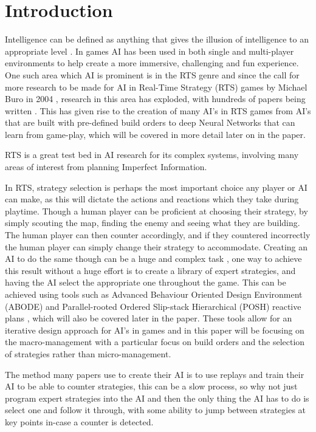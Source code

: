 \documentclass[journal]{IEEEtran}
\begin{document}
\section{Introduction}
 Intelligence can be defined as anything that gives the illusion of intelligence to an appropriate level \cite{AIBook}. In games AI has been used in both single and multi-player environments to help create a more immersive, challenging and fun experience. One such area which AI is prominent is in the RTS genre and since the call for more research to be made for AI in Real-Time Strategy (RTS) games by Michael Buro in 2004 \cite{CallFor}, research in this area has exploded, with hundreds of papers being written \cite{Survey}. This has given rise to the creation of many AI's in RTS games from AI's that are built with pre-defined build orders \cite{Swen} to deep Neural Networks \cite{Deep} that can learn from game-play, which will be covered in more detail later on in the paper.

RTS is a great test bed in AI research for its complex systems, involving many areas of interest from planning  Imperfect Information. \cite{StarCraftBot}

In RTS, strategy selection is perhaps the most important choice any player or AI can make, as this will dictate the actions and reactions which they take during playtime. Though a human player can be proficient at choosing their strategy, by simply scouting the map, finding the enemy and seeing what they are building. The human player can then counter accordingly, and if they countered incorrectly the human player can simply change their strategy to accommodate. Creating an AI to do the same though can be a huge and complex task \cite{Fuzzy}\cite{OnlineEvo}\cite{GoalDriven}, one way to achieve this result without a huge effort is to create a library of expert strategies, and having the AI select the appropriate one throughout the game. This can be achieved using tools such as Advanced Behaviour Oriented Design Environment (ABODE) and Parallel-rooted Ordered Slip-stack Hierarchical (POSH) reactive plans \cite{POSH}, which will also be covered later in the paper. These tools allow for an iterative design approach for AI's in games and in this paper will be focusing on the macro-management with a particular focus on build orders and the selection of strategies rather than micro-management. 

The method many papers use to create their AI is to use replays and train their AI to be able to counter strategies, this can be a slow process, so why not just program expert strategies into the AI and then the only thing the AI has to do is select one and follow it through, with some ability to jump between strategies at key points in-case a counter is detected. 
\end{document}
